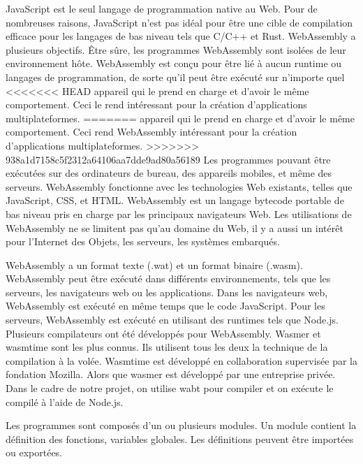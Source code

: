 \documentclass{rapportECL}
\begin{document}
JavaScript est le seul langage de programmation native au Web. 
Pour de nombreuses raisons, JavaScript n’est pas idéal pour être une cible de compilation efficace pour les langages de bas niveau tels que C/C++ et Rust. 
WebAssembly a plusieurs objectifs\cite{haas_bringing_2017}. Être sûre, les programmes WebAssembly sont isolées de leur environnement hôte. 
WebAssembly est conçu pour être lié à aucun runtime ou langages de programmation, de sorte qu'il peut être exécuté sur n'importe quel 
<<<<<<< HEAD
appareil qui le prend en charge et d’avoir le même comportement. Ceci le rend intéressant pour la création d'applications multiplateformes.
=======
appareil qui le prend en charge et d’avoir le même comportement. 
Ceci rend WebAssembly intéressant pour la création d'applications multiplateformes.
>>>>>>> 938a1d7158c5f2312a64106aa7dde9ad80a56189
Les programmes pouvant être exécutées sur des ordinateurs de bureau, des appareils mobiles, et même des serveurs. 
WebAssembly fonctionne avec les technologies Web existants, telles que JavaScript, CSS, et HTML.
WebAssembly est un langage bytecode portable de bas niveau pris en charge par les principaux navigateurs Web. 
Les utilisations de WebAssembly ne se limitent pas qu'au domaine du Web, il y a aussi un intérêt pour l'Internet des Objets, les serveurs, les systèmes embarqués.
\par WebAssembly a un format texte (.wat) et un format binaire (.wasm). 
WebAssembly peut être exécuté dans différents environnements, tels que les serveurs, les navigateurs web ou les applications. 
Dans les navigateurs web, WebAssembly est exécuté en même temps que le code JavaScript. 
Pour les serveurs, WebAssembly est exécuté en utilisant des runtimes tels que Node.js. 
Plusieurs compilateurs ont été développés pour WebAssembly\cite{noauthor_wabt_2023,noauthor_wasm3_2023,noauthor_wasmer_nodate,noauthor_wasmtime_nodate}. 
Wasmer\cite{noauthor_wasmer_nodate} et wasmtime\cite{noauthor_wasmtime_nodate} sont les plus connus. 
Ils utilisent tous les deux la technique de la compilation à la volée. Wasmtime est développé en collaboration supervisée par la fondation Mozilla. 
Alors que wasmer est développé par une entreprise privée. 
Dans le cadre de notre projet, on utilise wabt\cite{noauthor_wabt_2023} pour compiler et on exécute le compilé à l’aide de Node.js\cite{noauthor_nodejs_nodate}. 
\par Les programmes sont composés d'un ou plusieurs modules. Un module contient la définition des fonctions, variables globales. 
Les définitions peuvent être importées ou exportées.
\end{document}
